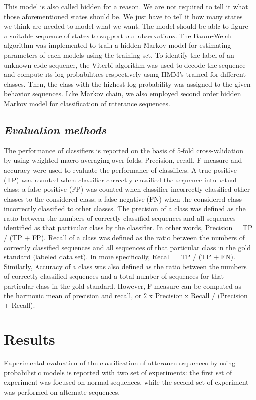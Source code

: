 \documentclass{amia}
\begin{document}
This model is also called hidden for a reason. We are not required to tell it what those aforementioned states should be. We just have to tell it how many states we think are needed to model what we want. The model should be able to figure a suitable sequence of states to support our observations. The Baum-Welch algorithm was implemented to train a hidden Markov model for estimating parameters of each models using the training set. To identify the label of an unknown code sequence, the Viterbi algorithm was used to decode the sequence and compute its log probabilities respectively using HMM's trained for different classes. Then, the class with the highest log probability was assigned to the given behavior sequences. Like Markov chain, we also employed second order hidden Markov model for classification of utterance sequences.   

\subsection*{\textit{Evaluation methods}}
The performance of classifiers is reported on the basis of 5-fold cross-validation by using weighted macro-averaging over folds. Precision, recall, F-measure and accuracy were used to evaluate the performance of classifiers. A true positive (TP) was counted when classifier correctly classified the sequence into actual class; a false positive (FP) was counted when classifier incorrectly classified other classes to the considered class; a false negative (FN) when the considered class incorrectly classified to other classes. The precision of a class was defined as the ratio between the numbers of correctly classified sequences and all sequences identified as that particular class by the classifier. In other words, Precision = TP / (TP + FP). Recall of a class was defined as the ratio between the numbers of correctly classified sequences and all sequences of that particular class in the gold standard (labeled data set). In more specifically, Recall = TP / (TP + FN). Similarly, Accuracy of a class was also defined as the ratio between the numbers of correctly classified sequences and a total number of sequences for that particular class in the gold standard. However, F-measure can be computed as the harmonic mean of precision and recall, or 2 x Precision x Recall / (Precision + Recall).  

\section*{Results}
Experimental evaluation of the classification of utterance sequences by using probabilistic models is reported with two set of experiments: the first set of experiment was focused on normal sequences, while the second set of experiment was performed on alternate sequences. 
\end{document}
